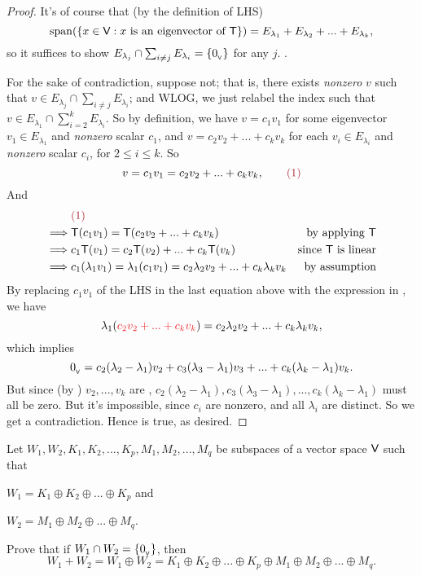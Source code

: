 \begin{proof}
It's of course that (by the definition of LHS)
\[
    \operatorname{span}(\{ x \in \textsf{V}: x \text{ is an eigenvector of } \textsf{T} \}) = E_{\lambda_1} + E_{\lambda_2} + ... + E_{\lambda_k},
\]
so it suffices to show \(E_{\lambda_j} \cap \sum_{i \ne j} E_{\lambda_i} = \{ 0_{_{\textsf{V}}} \}\) for any \(j\). .

For the sake of contradiction, suppose not;
that is, there exists \emph{nonzero} \(v\) such that \(v \in E_{\lambda_j} \cap \sum_{i \ne j} E_{\lambda_i}\);
and WLOG, we just relabel the index such that
\(v \in E_{\lambda_1} \cap \sum_{i = 2}^k E_{\lambda_i}\).
So by definition, we have \(v = c_1 v_1\) for some eigenvector \(v_1 \in E_{\lambda_1}\) and \emph{nonzero} scalar \(c_1\), and \(v = c_2 v_2 + ... + c_k v_k\) for each \(v_i \in E_{\lambda_i}\) and \emph{nonzero} scalar \(c_i\), for \(2 \le i \le k\).
So
\[
    v = c_1 v_1 = c_2 v_2 + ... + c_k v_k, \quad \quad \MAROON{(1)}
\]
And
\begin{align*}
             & \MAROON{(1)} \\
    \implies & \T(c_1 v_1) = \T(c_2 v_2 + ... + c_k v_k) & \text{by applying \(\T\)} \\
    \implies & c_1\T(v_1) = c_2\T(v_2) + ... + c_k\T(v_k) & \text{since \(\T\) is linear} \\
    \implies & c_1 (\lambda_1 v_1) = \lambda_1 (c_1 v_1) = c_2 \lambda_2 v_2 + ... + c_k \lambda_k v_k & \text{by assumption}
\end{align*}
By replacing \(c_1 v_1\) of the LHS in the last equation above with the expression in , we have
\[
    \lambda_1 (\RED{c_2 v_2 + ... + c_k v_k}) = c_2 \lambda_2 v_2 + ... + c_k \lambda_k v_k,
\]
which implies
\[
    0_{_{\textsf{V}}} = c_2 (\lambda_2 - \lambda_1) v_2 + c_3 (\lambda_3 - \lambda_1) v_3 + ... + c_k (\lambda_k - \lambda_1) v_k.
\]
But since (by ) \(v_2, ..., v_k\) are \LID{}, \(c_2(\lambda_2 - \lambda_1), c_3(\lambda_3 - \lambda_1), ..., c_k(\lambda_k - \lambda_1)\) must all be zero.
But it's impossible, since \(c_i\) are nonzero, and all \(\lambda_i\) are distinct.
So we get a contradiction.
Hence  is true, as desired.
\end{proof}

\begin{exercise} \label{exercise 5.2.24}
Let \(W_1, W_2, K_1, K_2, ..., K_p, M_1, M_2, ..., M_q\) be subspaces of a vector space \(\textsf{V}\) such that

 \(W_1 = K_1 \oplus K_2 \oplus ... \oplus K_p\) and

 \(W_2 = M_1 \oplus M_2 \oplus ... \oplus M_q\).

Prove that if  \(W_1 \cap W_2 = \{ 0_{_{\textsf{V}}} \}\), then
\[
    W_1 + W_2 = W_1 \oplus W_2 = K_1 \oplus K_2 \oplus ... \oplus K_p \oplus M_1 \oplus M_2 \oplus ... \oplus M_q.
\]
\end{exercise}

